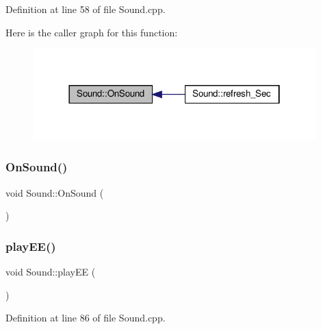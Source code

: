 Definition at line 58 of file Sound.\+cpp.

Here is the caller graph for this function\+:
\nopagebreak
\begin{figure}[H]
\begin{center}
\leavevmode
\includegraphics[width=310pt]{class_sound_ac26eda99f623e5a839d1c408d8a591d9_icgraph}
\end{center}
\end{figure}
\mbox{\label{class_sound_ac26eda99f623e5a839d1c408d8a591d9}} 
\subsubsection{\texorpdfstring{On\+Sound()}{OnSound()}\hspace{0.1cm}{\footnotesize\ttfamily [2/2]}}
{\footnotesize\ttfamily void Sound\+::\+On\+Sound (\begin{DoxyParamCaption}{ }\end{DoxyParamCaption})\hspace{0.3cm}{\ttfamily [protected]}}

\mbox{\label{class_sound_a887e5a54b6e00d4a33d63feb53017cfc}} 
\subsubsection{\texorpdfstring{play\+E\+E()}{playEE()}\hspace{0.1cm}{\footnotesize\ttfamily [1/2]}}
{\footnotesize\ttfamily void Sound\+::play\+EE (\begin{DoxyParamCaption}{ }\end{DoxyParamCaption})}



Definition at line 86 of file Sound.\+cpp.

